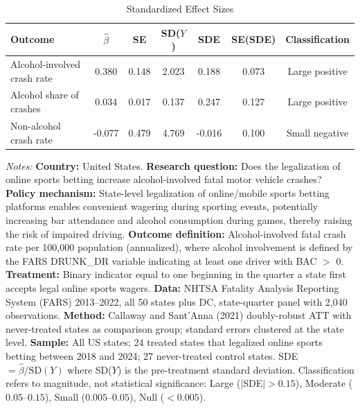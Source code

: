 \begin{table}[t]
\centering
\caption{Standardized Effect Sizes}
\label{tab:sde}
\small
\begin{tabular}{lcccccc}
\hline\hline
Outcome & $\hat{\beta}$ & SE & SD($Y$) & SDE & SE(SDE) & Classification \\
\hline
Alcohol-involved crash rate & 0.380 & 0.148 & 2.023 & 0.188 & 0.073 & Large positive \\
Alcohol share of crashes & 0.034 & 0.017 & 0.137 & 0.247 & 0.127 & Large positive \\
Non-alcohol crash rate & -0.077 & 0.479 & 4.769 & -0.016 & 0.100 & Small negative \\
\hline\hline
\end{tabular}
\begin{tablenotes}
\item \textit{Notes:} \textbf{Country:} United States. \textbf{Research question:} Does the legalization of online sports betting increase alcohol-involved fatal motor vehicle crashes? \textbf{Policy mechanism:} State-level legalization of online/mobile sports betting platforms enables convenient wagering during sporting events, potentially increasing bar attendance and alcohol consumption during games, thereby raising the risk of impaired driving. \textbf{Outcome definition:} Alcohol-involved fatal crash rate per 100,000 population (annualized), where alcohol involvement is defined by the FARS DRUNK\_DR variable indicating at least one driver with BAC $>$ 0. \textbf{Treatment:} Binary indicator equal to one beginning in the quarter a state first accepts legal online sports wagers. \textbf{Data:} NHTSA Fatality Analysis Reporting System (FARS) 2013--2022, all 50 states plus DC, state-quarter panel with 2,040 observations. \textbf{Method:} Callaway and Sant'Anna (2021) doubly-robust ATT with never-treated states as comparison group; standard errors clustered at the state level. \textbf{Sample:} All US states; 24 treated states that legalized online sports betting between 2018 and 2024; 27 never-treated control states. SDE $= \hat{\beta} / \text{SD}(Y)$ where SD($Y$) is the pre-treatment standard deviation. Classification refers to magnitude, not statistical significance: Large ($|$SDE$| > 0.15$), Moderate ($0.05$--$0.15$), Small ($0.005$--$0.05$), Null ($< 0.005$). 
\end{tablenotes}
\end{table}
